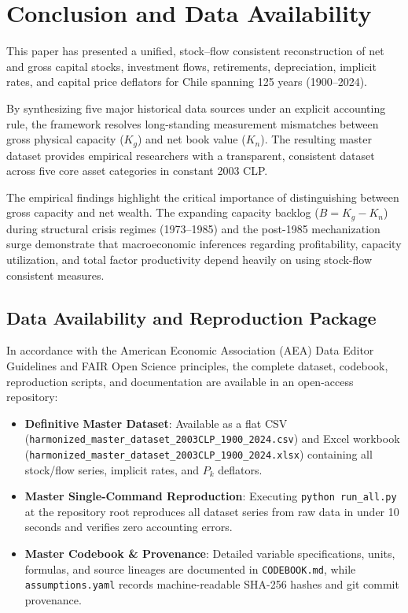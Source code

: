 \section{Conclusion and Data Availability}\label{sec:conclusion}

This paper has presented a unified, stock--flow consistent reconstruction of net and gross capital stocks, investment flows, retirements, depreciation, implicit rates, and capital price deflators for Chile spanning 125 years (1900--2024).

By synthesizing five major historical data sources under an explicit accounting rule, the framework resolves long-standing measurement mismatches between gross physical capacity ($K_g$) and net book value ($K_n$). The resulting master dataset provides empirical researchers with a transparent, consistent dataset across five core asset categories in constant 2003 CLP.

The empirical findings highlight the critical importance of distinguishing between gross capacity and net wealth. The expanding capacity backlog ($B = K_g - K_n$) during structural crisis regimes (1973--1985) and the post-1985 mechanization surge demonstrate that macroeconomic inferences regarding profitability, capacity utilization, and total factor productivity depend heavily on using stock-flow consistent measures.

\subsection{Data Availability and Reproduction Package}
In accordance with the American Economic Association (AEA) Data Editor Guidelines and FAIR Open Science principles, the complete dataset, codebook, reproduction scripts, and documentation are available in an open-access repository:

\begin{itemize}
    \item \textbf{Definitive Master Dataset}: Available as a flat CSV (\texttt{harmonized\_master\_dataset\_2003CLP\_1900\_2024.csv}) and Excel workbook (\texttt{harmonized\_master\_dataset\_2003CLP\_1900\_2024.xlsx}) containing all stock/flow series, implicit rates, and $P_k$ deflators.
    \item \textbf{Master Single-Command Reproduction}: Executing \texttt{python run\_all.py} at the repository root reproduces all dataset series from raw data in under 10 seconds and verifies zero accounting errors.
    \item \textbf{Master Codebook \& Provenance}: Detailed variable specifications, units, formulas, and source lineages are documented in \texttt{CODEBOOK.md}, while \texttt{assumptions.yaml} records machine-readable SHA-256 hashes and git commit provenance.
\end{itemize}
